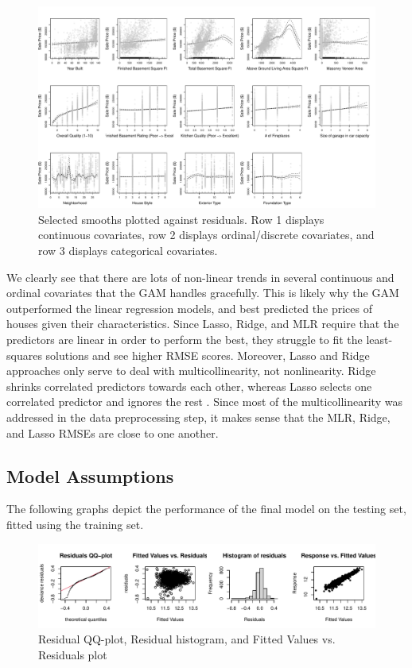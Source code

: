 \documentclass[aoas]{imsart}
\numberwithin{equation}{section}
\theoremstyle{plain}
\theoremstyle{remark}
\begin{document}
\begin{figure}
\centering
\includegraphics{STAT-444-FINAL-PROJECT-PAPER_files/figure-latex/unnamed-chunk-8-1.pdf}
\caption{Selected smooths plotted against residuals. Row 1 displays
continuous covariates, row 2 displays ordinal/discrete covariates, and
row 3 displays categorical covariates.\label{smooths}}
\end{figure}

We clearly see that there are lots of non-linear trends in several
continuous and ordinal covariates that the GAM handles gracefully. This
is likely why the GAM outperformed the linear regression models, and
best predicted the prices of houses given their characteristics. Since
Lasso, Ridge, and MLR require that the predictors are linear in order to
perform the best, they struggle to fit the least-squares solutions and
see higher RMSE scores. Moreover, Lasso and Ridge approaches only serve
to deal with multicollinearity, not nonlinearity. Ridge shrinks
correlated predictors towards each other, whereas Lasso selects one
correlated predictor and ignores the rest \citep{JSSv033i01}. Since most
of the multicollinearity was addressed in the data preprocessing step,
it makes sense that the MLR, Ridge, and Lasso RMSEs are close to one
another.

\hypertarget{model-assumptions}{%
\subsection{Model Assumptions}\label{model-assumptions}}

The following graphs depict the performance of the final model on the
testing set, fitted using the training set.

\begin{figure}
\includegraphics[trim={0 0.4cm 0 0.2cm},clip]{STAT-444-FINAL-PROJECT-PAPER_files/figure-latex/unnamed-chunk-9-1} \caption{Residual QQ-plot, Residual histogram, and Fitted Values vs. Residuals plot\label{assumptions}}\label{fig:unnamed-chunk-9}
\end{figure}
\end{document}
